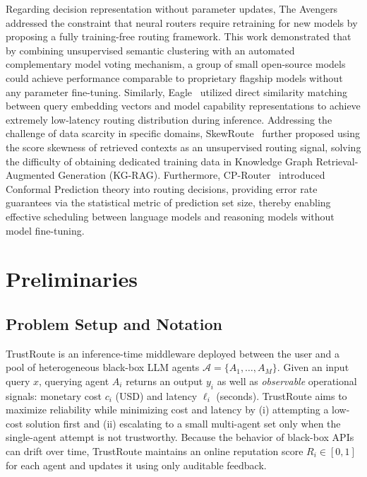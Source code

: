\documentclass[acmsmall,screen,review,anonymous]{acmart}
\begin{document}
Regarding decision representation without parameter updates, The Avengers~\cite{zhang2025avengers} addressed the constraint that neural routers require retraining for new models by proposing a fully training-free routing framework. This work demonstrated that by combining unsupervised semantic clustering with an automated complementary model voting mechanism, a group of small open-source models could achieve performance comparable to proprietary flagship models without any parameter fine-tuning. Similarly, Eagle~\cite{zhao2024eagle} utilized direct similarity matching between query embedding vectors and model capability representations to achieve extremely low-latency routing distribution during inference. Addressing the challenge of data scarcity in specific domains, SkewRoute~\cite{wang2025skewroute} further proposed using the score skewness of retrieved contexts as an unsupervised routing signal, solving the difficulty of obtaining dedicated training data in Knowledge Graph Retrieval-Augmented Generation (KG-RAG). Furthermore, CP-Router~\cite{su2025cp} introduced Conformal Prediction theory into routing decisions, providing error rate guarantees via the statistical metric of prediction set size, thereby enabling effective scheduling between language models and reasoning models without model fine-tuning.




\section{Preliminaries}
\label{sec:prelim}

\subsection{Problem Setup and Notation}
TrustRoute is an inference-time middleware deployed between the user and a pool of heterogeneous black-box LLM agents
$\mathcal{A}=\{A_1,\dots,A_M\}$.
Given an input query $x$, querying agent $A_i$ returns an output $y_i$ as well as \emph{observable} operational signals:
monetary cost $c_i$ (USD) and latency $\ell_i$ (seconds).
TrustRoute aims to maximize reliability while minimizing cost and latency by (i) attempting a low-cost solution first and (ii) escalating to a small multi-agent set only when the single-agent attempt is not trustworthy.
Because the behavior of black-box APIs can drift over time, TrustRoute maintains an online reputation score $R_i\in[0,1]$ for each agent and updates it using only auditable feedback.
\end{document}
